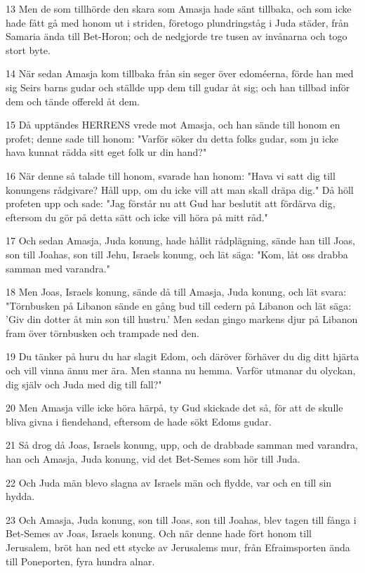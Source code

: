 \par 13 Men de som tillhörde den skara som Amasja hade sänt tillbaka, och som icke hade fått gå med honom ut i striden, företogo plundringståg i Juda städer, från Samaria ända till Bet-Horon; och de nedgjorde tre tusen av invånarna och togo stort byte.
\par 14 När sedan Amasja kom tillbaka från sin seger över edoméerna, förde han med sig Seirs barns gudar och ställde upp dem till gudar åt sig; och han tillbad inför dem och tände offereld åt dem.
\par 15 Då upptändes HERRENS vrede mot Amasja, och han sände till honom en profet; denne sade till honom: "Varför söker du detta folks gudar, som ju icke hava kunnat rädda sitt eget folk ur din hand?"
\par 16 När denne så talade till honom, svarade han honom: "Hava vi satt dig till konungens rådgivare? Håll upp, om du icke vill att man skall dräpa dig." Då höll profeten upp och sade: "Jag förstår nu att Gud har beslutit att fördärva dig, eftersom du gör på detta sätt och icke vill höra på mitt råd."
\par 17 Och sedan Amasja, Juda konung, hade hållit rådplägning, sände han till Joas, son till Joahas, son till Jehu, Israels konung, och lät säga: "Kom, låt oss drabba samman med varandra."
\par 18 Men Joas, Israels konung, sände då till Amasja, Juda konung, och lät svara: "Törnbusken på Libanon sände en gång bud till cedern på Libanon och lät säga: 'Giv din dotter åt min son till hustru.' Men sedan gingo markens djur på Libanon fram över törnbusken och trampade ned den.
\par 19 Du tänker på huru du har slagit Edom, och däröver förhäver du dig ditt hjärta och vill vinna ännu mer ära. Men stanna nu hemma. Varför utmanar du olyckan, dig själv och Juda med dig till fall?"
\par 20 Men Amasja ville icke höra härpå, ty Gud skickade det så, för att de skulle bliva givna i fiendehand, eftersom de hade sökt Edoms gudar.
\par 21 Så drog då Joas, Israels konung, upp, och de drabbade samman med varandra, han och Amasja, Juda konung, vid det Bet-Semes som hör till Juda.
\par 22 Och Juda män blevo slagna av Israels män och flydde, var och en till sin hydda.
\par 23 Och Amasja, Juda konung, son till Joas, son till Joahas, blev tagen till fånga i Bet-Semes av Joas, Israels konung. Och när denne hade fört honom till Jerusalem, bröt han ned ett stycke av Jerusalems mur, från Efraimsporten ända till Poneporten, fyra hundra alnar.
